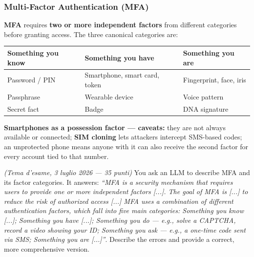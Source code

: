 \documentclass[12pt, a4paper]{article}
\newcounter{esercizio}[section]
\begin{document}
\subsubsection{Multi-Factor Authentication (MFA)}
\textbf{MFA} requires \textbf{two or more independent factors} from different categories before granting access. The three canonical categories are:

\begin{center}
\begin{tabular}{@{}lll@{}}
\toprule
\textbf{Something you know} & \textbf{Something you have} & \textbf{Something you are} \\
\midrule
Password / PIN & Smartphone, smart card, token & Fingerprint, face, iris \\
Passphrase & Wearable device & Voice pattern \\
Secret fact & Badge & DNA signature \\
\bottomrule
\end{tabular}
\end{center}

\textcolor{red!70!black}{\textbf{Smartphones as a possession factor — caveats:}} they are not always available or connected; \textbf{SIM cloning} lets attackers intercept SMS-based codes; an unprotected phone means anyone with it can also receive the second factor for every account tied to that number.

\begin{tcolorbox}[colback=lightergray!10, colframe=tocsec, title=\textbf{Esercizio \theesercizio}]
\textit{(Tema d'esame, 3 luglio 2026 — 35 punti)} You ask an LLM to describe MFA and its factor categories. It answers: \textit{``MFA is a security mechanism that requires users to provide one or more independent factors [...]. The goal of MFA is [...] to reduce the risk of authorized access [...] MFA uses a combination of different authentication factors, which fall into five main categories: Something you know [...]; Something you have [...]; Something you do — e.g., solve a CAPTCHA, record a video showing your ID; Something you ask — e.g., a one-time code sent via SMS; Something you are [...]''}. Describe the errors and provide a correct, more comprehensive version.
\end{tcolorbox}
\end{document}
